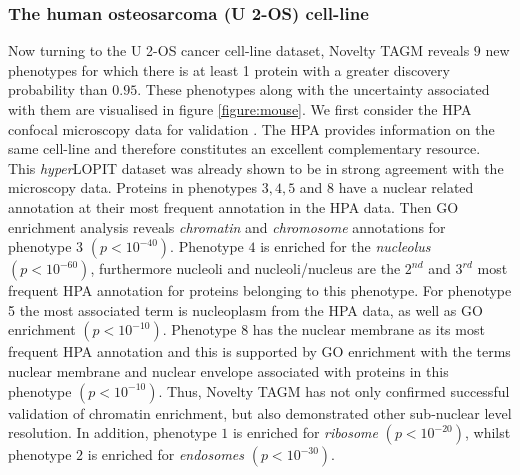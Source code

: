 \documentclass[12pt,english]{article}
\begin{document}
\subsubsection{The human osteosarcoma (U 2-OS) cell-line}
Now turning to the U 2-OS cancer cell-line dataset, Novelty TAGM reveals $9$ new phenotypes for which there is at least 1 protein with a greater discovery probability than $0.95$. These phenotypes along with the uncertainty associated with them are visualised in figure \ref{figure:mouse}. We first consider the HPA confocal microscopy data for validation \citep{Thul:2017, Sullivan:2018}. The HPA provides information on the same cell-line and therefore constitutes an excellent complementary resource. This \textit{hyper}LOPIT dataset was already shown to be in strong agreement with the microscopy data. Proteins in phenotypes $3,4,5$ and $8$ have a nuclear related annotation at their most frequent annotation in the HPA data. Then GO enrichment analysis reveals \textit{chromatin} and \textit{chromosome} annotations for phenotype 3 $(p < 10^{-40})$. Phenotype $4$ is enriched for the \textit{nucleolus} $(p < 10^{-60})$, furthermore nucleoli and nucleoli/nucleus are the $2^{nd}$ and $3^{rd}$ most frequent HPA annotation for proteins belonging to this phenotype. For phenotype 5 the most associated term is nucleoplasm from the HPA data, as well as GO enrichment $(p < 10^{-10})$. Phenotype $8$ has the nuclear membrane as its most frequent HPA annotation and this is supported by GO enrichment with the terms nuclear membrane and nuclear envelope associated with proteins in this phenotype $(p < 10^{-10})$. Thus, Novelty TAGM has not only confirmed successful validation of chromatin enrichment, but also demonstrated other sub-nuclear level resolution. In addition, phenotype $1$ is enriched for \textit{ribosome} $( p < 10^{-20})$, whilst phenotype $2$ is enriched for \textit{endosomes} $(p < 10^{-30})$.
\end{document}
